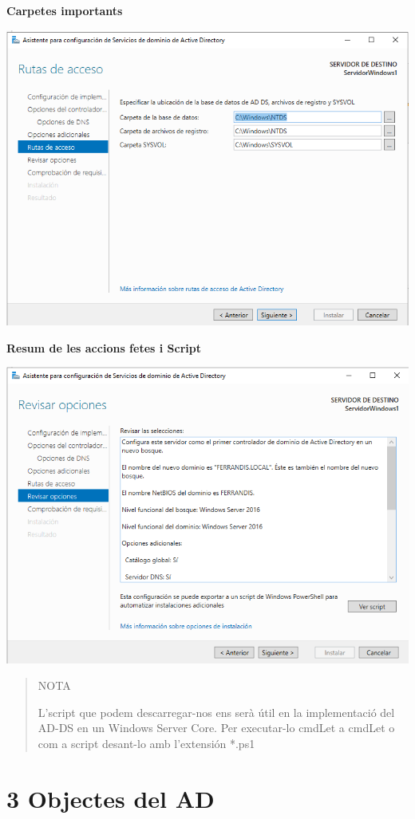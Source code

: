 \documentclass[
  a4paper,
]{article}
\begin{document}
\textbf{Carpetes importants}

\includegraphics{png/carpetesimportants.png}

\textbf{Resum de les accions fetes i Script}

\includegraphics{png/afegirboscfi.png}

\begin{quote}
NOTA

L'script que podem descarregar-nos ens serà útil en la implementació del
AD-DS en un Windows Server Core. Per executar-lo cmdLet a cmdLet o com a
script desant-lo amb l'extensión *.ps1
\end{quote}

\section{3 Objectes del AD}\label{objectes-del-ad}
\end{document}
